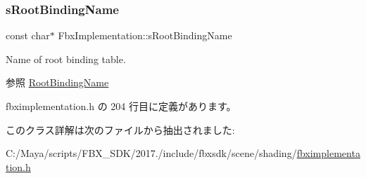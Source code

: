 \subsubsection{\texorpdfstring{s\+Root\+Binding\+Name}{sRootBindingName}}
{\footnotesize\ttfamily const char$\ast$ Fbx\+Implementation\+::s\+Root\+Binding\+Name\hspace{0.3cm}{\ttfamily [static]}}

Name of root binding table. \begin{DoxySeeAlso}{参照}
\hyperlink{class_fbx_implementation_a80df4effca2446b00f8925634c3d26aa}{Root\+Binding\+Name} 
\end{DoxySeeAlso}


 fbximplementation.\+h の 204 行目に定義があります。



このクラス詳解は次のファイルから抽出されました\+:\begin{DoxyCompactItemize}
\item 
C\+:/\+Maya/scripts/\+F\+B\+X\+\_\+\+S\+D\+K/2017./include/fbxsdk/scene/shading/\hyperlink{fbximplementation_8h}{fbximplementation.\+h}\end{DoxyCompactItemize}
